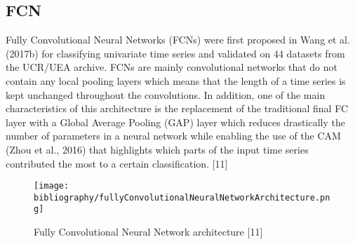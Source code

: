 \documentclass{ieeeojies}
\begin{document}
\subsection{FCN}
Fully Convolutional Neural Networks (FCNs) were first proposed in Wang et al. (2017b) for classifying univariate time series and validated on 44 datasets from the UCR/UEA archive. FCNs are mainly convolutional networks that do not contain any local pooling layers which means that the length of a time series is kept unchanged throughout the convolutions. In addition, one of the main characteristics of this architecture is the replacement of the traditional final FC layer with a Global Average Pooling (GAP) layer which reduces drastically the number of parameters in a neural network while enabling the use of the CAM (Zhou et al., 2016) that highlights which parts of the input time series contributed the most to a certain classification.  [11]
\begin{figure}[H]
    \centering
    \begin{minipage}{1\linewidth}
        \centering
        \texttt{[image: bibliography/fullyConvolutionalNeuralNetworkArchitecture.png]}
        \caption{Fully Convolutional Neural Network architecture [11]}
        \label{fig11}
    \end{minipage}
\end{figure}
\end{document}
